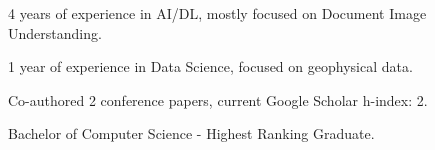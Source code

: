 \begin{zitemize}
    \item 4 years of experience in AI/DL, mostly focused on Document Image Understanding.
    \item 1 year of experience in Data Science, focused on geophysical data.
    \item Co-authored 2 conference papers, current Google Scholar h-index: 2.
    \item Bachelor of Computer Science - Highest Ranking Graduate.
\end{zitemize}
